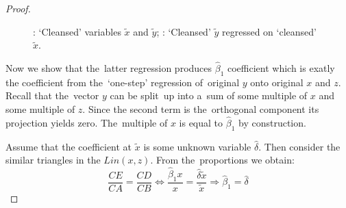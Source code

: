 \begin{proof}
\begin{figure}[ht!]
\begin{center}
\caption{: `Cleansed' variables $\tilde x$ and $\tilde y$;
: `Cleansed' $\tilde y$ regressed on `cleansed' $\tilde{x}$.}
\end{center}
\end{figure}

Now we show that the~latter regression produces $\hat \beta_1$ coefficient which
is exatly the coefficient from the~`one-step' regression of~original $y$ onto
original $x$ and $z$. Recall that the~vector $y$ can be split~up into a~sum of
some multiple of $x$ and some multiple of $z$. Since the second term is
the~orthogonal component its projection yields zero. The~multiple of $x$
is equal to $\hat \beta_1$ by construction.

Assume that the coefficient at $\tilde x$ is some unknown variable $\hat \delta$.
Then consider the similar triangles in the $Lin(x,z)$. From the~proportions
we obtain:
\[
\frac{CE}{CA} = \frac{CD}{CB} \Leftrightarrow \frac{\hat \beta_1 x}{x} = \frac{\hat \delta \tilde x}{\tilde x} \Rightarrow \hat \beta_1 = \hat \delta
\]


\end{proof}
